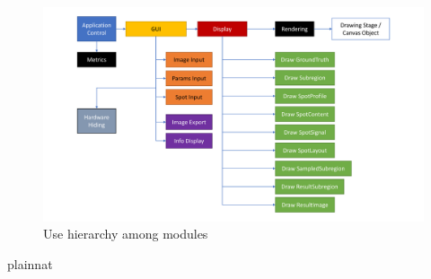 \documentclass[12pt, titlepage]{article}
\begin{document}
\begin{figure}[H]
\centering
\includegraphics[width=1.00\textwidth]{MG_graph.pdf}
\caption{Use hierarchy among modules}
\label{FigUH}
\end{figure}


 {plainnat}


\newpage{}
\end{document}
